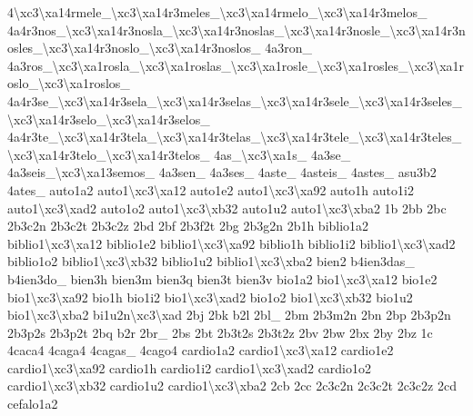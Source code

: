 \begin{DoxyCompactItemize}
4\textbackslash{}xc3\textbackslash{}xa14rmele\-\_\textbackslash{}xc3\textbackslash{}xa14r3meles\-\_\textbackslash{}xc3\textbackslash{}xa14rmelo\-\_\textbackslash{}xc3\textbackslash{}xa14r3melos\-\_\- 4a4r3nos\-\_\textbackslash{}xc3\textbackslash{}xa14r3nosla\-\_\textbackslash{}xc3\textbackslash{}xa14r3noslas\-\_\textbackslash{}xc3\textbackslash{}xa14r3nosle\-\_\textbackslash{}xc3\textbackslash{}xa14r3nosles\-\_\textbackslash{}xc3\textbackslash{}xa14r3noslo\-\_\textbackslash{}xc3\textbackslash{}xa14r3noslos\-\_\- 4a3ron\-\_\- 4a3ros\-\_\textbackslash{}xc3\textbackslash{}xa1rosla\-\_\textbackslash{}xc3\textbackslash{}xa1roslas\-\_\textbackslash{}xc3\textbackslash{}xa1rosle\-\_\textbackslash{}xc3\textbackslash{}xa1rosles\-\_\textbackslash{}xc3\textbackslash{}xa1roslo\-\_\textbackslash{}xc3\textbackslash{}xa1roslos\-\_\- 4a4r3se\-\_\textbackslash{}xc3\textbackslash{}xa14r3sela\-\_\textbackslash{}xc3\textbackslash{}xa14r3selas\-\_\textbackslash{}xc3\textbackslash{}xa14r3sele\-\_\textbackslash{}xc3\textbackslash{}xa14r3seles\-\_\textbackslash{}xc3\textbackslash{}xa14r3selo\-\_\textbackslash{}xc3\textbackslash{}xa14r3selos\-\_\- 4a4r3te\-\_\textbackslash{}xc3\textbackslash{}xa14r3tela\-\_\textbackslash{}xc3\textbackslash{}xa14r3telas\-\_\textbackslash{}xc3\textbackslash{}xa14r3tele\-\_\textbackslash{}xc3\textbackslash{}xa14r3teles\-\_\textbackslash{}xc3\textbackslash{}xa14r3telo\-\_\textbackslash{}xc3\textbackslash{}xa14r3telos\-\_\- 4as\-\_\textbackslash{}xc3\textbackslash{}xa1s\-\_\- 4a3se\-\_\- 4a3seis\-\_\textbackslash{}xc3\textbackslash{}xa13semos\-\_\- 4a3sen\-\_\- 4a3ses\-\_\- 4aste\-\_\- 4asteis\-\_\- 4astes\-\_\- asu3b2 4ates\-\_\- auto1a2 auto1\textbackslash{}xc3\textbackslash{}xa12 auto1e2 auto1\textbackslash{}xc3\textbackslash{}xa92 auto1h auto1i2 auto1\textbackslash{}xc3\textbackslash{}xad2 auto1o2 auto1\textbackslash{}xc3\textbackslash{}xb32 auto1u2 auto1\textbackslash{}xc3\textbackslash{}xba2 1b 2bb 2bc 2b3c2n 2b3c2t 2b3c2z 2bd 2bf 2b3f2t 2bg 2b3g2n 2b1h biblio1a2 biblio1\textbackslash{}xc3\textbackslash{}xa12 biblio1e2 biblio1\textbackslash{}xc3\textbackslash{}xa92 biblio1h biblio1i2 biblio1\textbackslash{}xc3\textbackslash{}xad2 biblio1o2 biblio1\textbackslash{}xc3\textbackslash{}xb32 biblio1u2 biblio1\textbackslash{}xc3\textbackslash{}xba2 bien2 b4ien3das\-\_\- b4ien3do\-\_\- bien3h bien3m bien3q bien3t bien3v bio1a2 bio1\textbackslash{}xc3\textbackslash{}xa12 bio1e2 bio1\textbackslash{}xc3\textbackslash{}xa92 bio1h bio1i2 bio1\textbackslash{}xc3\textbackslash{}xad2 bio1o2 bio1\textbackslash{}xc3\textbackslash{}xb32 bio1u2 bio1\textbackslash{}xc3\textbackslash{}xba2 bi1u2n\textbackslash{}xc3\textbackslash{}xad 2bj 2bk b2l 2bl\-\_\- 2bm 2b3m2n 2bn 2bp 2b3p2n 2b3p2s 2b3p2t 2bq b2r 2br\-\_\- 2bs 2bt 2b3t2s 2b3t2z 2bv 2bw 2bx 2by 2bz 1c 4caca4 4caga4 4cagas\-\_\- 4cago4 cardio1a2 cardio1\textbackslash{}xc3\textbackslash{}xa12 cardio1e2 cardio1\textbackslash{}xc3\textbackslash{}xa92 cardio1h cardio1i2 cardio1\textbackslash{}xc3\textbackslash{}xad2 cardio1o2 cardio1\textbackslash{}xc3\textbackslash{}xb32 cardio1u2 cardio1\textbackslash{}xc3\textbackslash{}xba2 2cb 2cc 2c3c2n 2c3c2t 2c3c2z 2cd cefalo1a2 
\end{DoxyCompactItemize}
